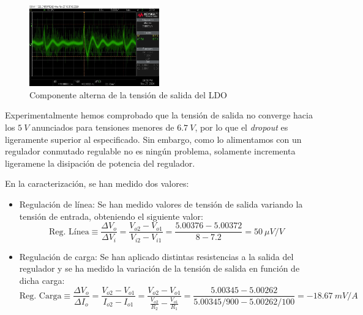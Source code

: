 \begin{figure}[H]
    \centering
    \includegraphics[width=0.5\textwidth]{images/2-hardware/componentes/ldo/picosConLDO.jpg}
    \caption{Componente alterna de la tensión de salida del LDO}
    \label{fig:hardware/modulos/ldo-sin-picos}
\end{figure}

Experimentalmente hemos comprobado que la tensión de salida no converge hacia los $5\ V$ anunciados para tensiones menores de $6.7\ V$, por lo que el \textit{dropout} es ligeramente superior al especificado. Sin embargo, como lo alimentamos con un regulador conmutado regulable no es ningún problema, solamente incrementa ligeramene la disipación de potencia del regulador.

En la caracterización, se han medido dos valores: \begin{itemize}
    \item Regulación de línea: Se han medido valores de tensión de salida variando la tensión de entrada, obteniendo el siguiente valor: \[ \text{Reg. Línea} \equiv \frac{\Delta V_o}{\Delta V_i} = \frac{V_{o2} - V_{o1}}{V_{i2} - V_{i1}} = \frac{5.00376 - 5.00372}{8 - 7.2} = 50\ \mu V/V \]

    \item Regulación de carga: Se han aplicado distintas resistencias a la salida del regulador y se ha medido la variación de la tensión de salida en función de dicha carga: \[ \text{Reg. Carga} \equiv \frac{\Delta V_o}{\Delta I_o} = \frac{V_{o2} - V_{o1}}{I_{o2} - I_{o1}} = \frac{V_{o2} - V_{o1}}{\frac{V_{o2}}{R_2} - \frac{V_{o1}}{R_1}} = \frac{5.00345 - 5.00262}{5.00345/900 - 5.00262/100} = -18.67\ mV/A \]
\end{itemize}